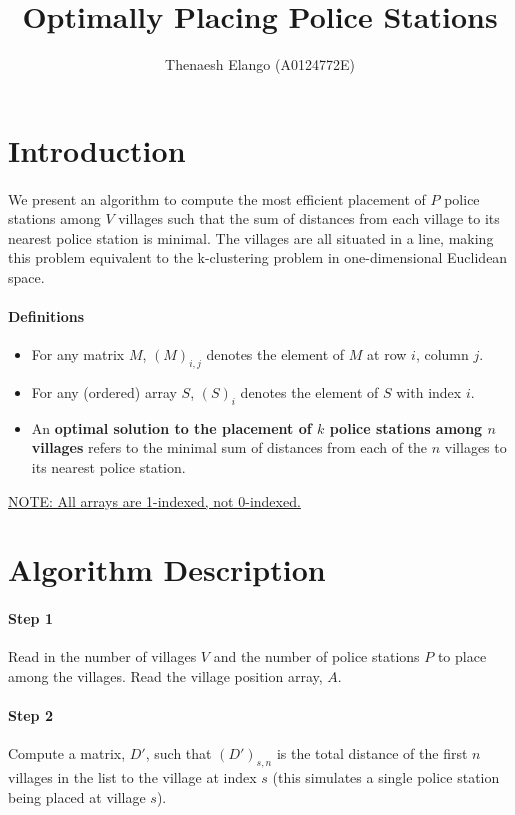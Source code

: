 \documentclass[]{article}
\title{Optimally Placing Police Stations}
\author{Thenaesh Elango (A0124772E)}
\begin{document}
	
	
	\maketitle
	
	\section{Introduction}
		\paragraph{}
		We present an algorithm to compute the most efficient placement of $P$ police stations among $V$ villages such that the sum of distances from each village to its nearest police station is minimal. The villages are all situated in a line, making this problem equivalent to the k-clustering problem in one-dimensional Euclidean space.
		
		\paragraph{Definitions}
		\begin{itemize}
			\item For any matrix $M$, $(M)_{i,j}$ denotes the element of $M$ at row $i$, column $j$.
			\item For any (ordered) array $S$, $(S)_i$ denotes the element of $S$ with index $i$.
			\item An \textbf{optimal solution to the placement of $k$ police stations among $n$ villages} refers to the minimal sum of distances from each of the $n$ villages to its nearest police station.
		\end{itemize}
		\underline{NOTE: All arrays are 1-indexed, not 0-indexed.}
		
	\section{Algorithm Description}
		\paragraph{Step 1}
		Read in the number of villages $V$ and the number of police stations $P$ to place among the villages. Read the village position array, $A$.
		
		\paragraph{Step 2}
		Compute a matrix, $D'$, such that $(D')_{s, n}$ is the total distance of the first $n$ villages in the list to the village at index $s$ (this simulates a single police station being placed at village $s$).
		
\end{document}
